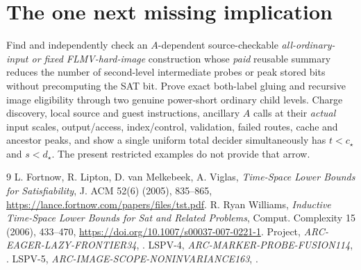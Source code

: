 \documentclass[11pt]{article}
\begin{document}
\section{The one next missing implication}
Find and independently check an $A$-dependent source-checkable
\emph{all-ordinary-input or fixed FLMV-hard-image} construction
whose \emph{paid} reusable summary reduces the number of
second-level intermediate probes or peak stored bits without
precomputing the SAT bit. Prove exact both-label gluing and
recursive image eligibility through two genuine power-short
ordinary child levels. Charge discovery, local source and guest
instructions, ancillary $A$ calls at their \emph{actual}
input scales, output/access, index/control, validation, failed
routes, cache and ancestor peaks, and show a single uniform
total decider simultaneously has
$t<c_\star$ and $s<d_\star$.
The present restricted examples do not provide that arrow.

\begin{thebibliography}{9}
 L. Fortnow, R. Lipton, D. van Melkebeek,
A. Viglas, \emph{Time-Space Lower Bounds for Satisfiability},
J. ACM 52(6) (2005), 835--865,
\url{https://lance.fortnow.com/papers/files/tst.pdf}.
 R. Ryan Williams,
\emph{Inductive Time-Space Lower Bounds for Sat and Related
Problems}, Comput. Complexity 15 (2006), 433--470,
\url{https://doi.org/10.1007/s00037-007-0221-1}.
 Project, \emph{ARC-EAGER-LAZY-FRONTIER34},
.
 LSPV-4,
\emph{ARC-MARKER-PROBE-FUSION114},
.
 LSPV-5,
\emph{ARC-IMAGE-SCOPE-NONINVARIANCE163},
.
\end{thebibliography}
\end{document}
